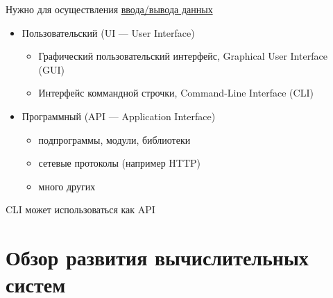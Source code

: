 {{        Нужно для осуществления \underline{ввода/вывода данных}
        \vspace{0.5cm}
        \begin{itemize}
          \item Пользовательский (UI --- User Interface)
            \begin{itemize}
              \item Графический пользовательский интерфейс, Graphical User Interface (GUI)
              \item Интерфейс коммандной строчки, Command-Line Interface (CLI)
            \end{itemize}
          \item Программный (API --- Application Interface)
            \begin{itemize}
              \item подпрограммы, модули, библиотеки
              \item сетевые протоколы (например HTTP)
              \item много других
            \end{itemize}
        \end{itemize}
        \vspace{0.4cm}
        CLI может использоваться как API
    }

  \section{Обзор развития вычислительных систем}

}
